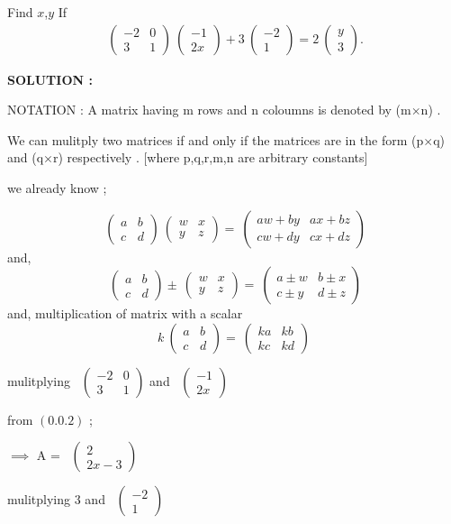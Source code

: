 \documentclass[journal,12pt,twocolumn]{IEEEtran}
\theoremstyle{remark}
\newcommand{\myvec}[1]{\ensuremath{\begin{pmatrix}#1\end{pmatrix}}}
\numberwithin{equation}{subsection}
\begin{document}
  Find \hspace{0.05cm}$x$,$ y $       
       If 
       \begin{align}
       \ \myvec{-2 & 0\\3 & 1}
\ \myvec{-1\\2x}  
 + 3\ \myvec{-2 \\1 } 
 = 2\ \myvec{y \\3 } .
        \end{align}

  \bigskip
  \textbf{SOLUTION : }  
  
  {NOTATION : } A matrix having m rows and n coloumns is denoted by (m$\times$n) .
  
  We can mulitply two matrices if and only if the matrices are in the form (p$\times$q) and (q$\times$r) respectively .
   [where p,q,r,m,n are arbitrary constants]
   
  we already know ;
    
    \begin{equation}
       \ \myvec{a & b \\c & d } 
      \ \myvec{w & x \\y & z } 
      =
       \ \myvec{aw+ by & ax+ bz \\cw+ dy& cx+ dz} 
    \end{equation}
    and,
    \begin{equation}
      \ \myvec{a & b \\c & d } 
      \pm
      \ \myvec{w & x \\y & z } 
      =
       \ \myvec{a\pm w & b\pm x \\c\pm y& d\pm z} 
    \end{equation}
    and,
    multiplication of matrix with a scalar
    \begin{equation}
     k \ \myvec{a & b \\c & d } 
      =
       \ \myvec{ka & kb \\kc & kd } 
    \end{equation}
    
   mulitplying \ \myvec{-2 & 0 \\3 & 1 } 
      and 
      \ \myvec{-1 \\2x }
      
     from $(0.0.2)$ ;
      
      $\implies$  A = \ \myvec{2 \\2x-3 } 
      
    mulitplying 
    $3$ and
       \ \myvec{-2 \\1 } 
      
\end{document}
